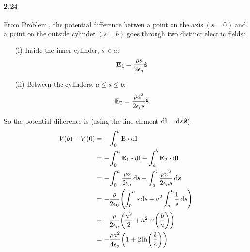 \documentclass[../main.tex]{subfiles}
\begin{document}
\paragraph{2.24}
From Problem , the potential difference betwen a point on the axis $(s = 0)$ and
a point on the outside cylinder $(s = b)$ goes through two distinct electric fields:
\begin{enumerate}
    \item[(i)] Inside the inner cylinder, $s < a$:
    \[ \vb{E}_1 = \frac{\rho s}{2\epsilon_o} \vu{s} \]
    \item[(ii)] Between the cylinders, $a \leq s \leq b$:
    \[ \vb{E}_2 = \frac{\rho a^2}{2\epsilon_o s} \vu{s} \]
\end{enumerate}
So the potential difference is (using the line element $\dd{\vb{l}} = \dd{s} \vu{s}$):
\begin{align*}
    V(b) - V(0) &= - \int_0^b \vb{E} \vdot \dd{\vb{l}} \\
    &= - \int_0^a \vb{E}_1 \vdot \dd{\vb{l}} - \int_a^b \vb{E}_2 \vdot \dd{\vb{l}} \\
    &= - \int_0^a \frac{\rho s}{2\epsilon_o} \dd{s}
    - \int_a^b \frac{\rho a^2}{2\epsilon_o s} \dd{s} \\
    &= - \frac{\rho}{2\epsilon_0} \qt(\int_0^a s \dd{s} + a^2 \int_a^b \frac{1}{s} \dd{s}) \\
    &= - \frac{\rho}{2\epsilon_o} \qt(\frac{a^2}{2} + a^2 \ln(\frac{b}{a})) \\
    &= - \frac{\rho a^2}{4\epsilon_o} \qt(1 + 2\ln(\frac{b}{a}))
\end{align*}
\end{document}
